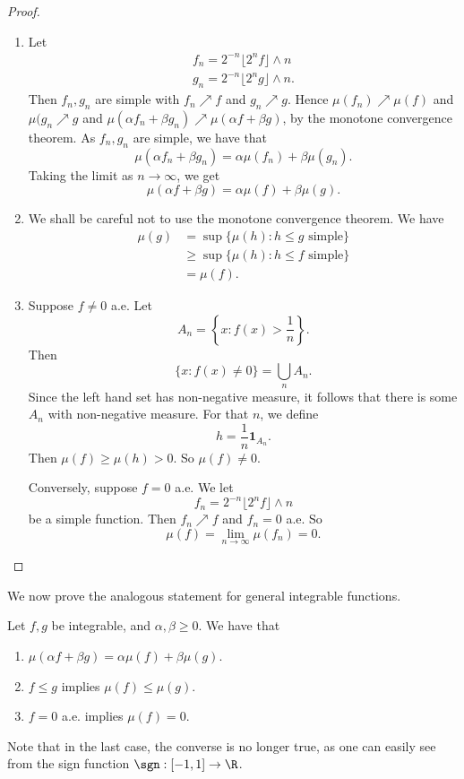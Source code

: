 \documentclass[a4paper]{article}
\begin{document}
\begin{proof}\leavevmode
  \begin{enumerate}
    \item Let
      \begin{align*}
        f_n = 2^{-n}\lfloor 2^n f\rfloor \wedge n\\
        g_n = 2^{-n}\lfloor 2^n g\rfloor \wedge n.
      \end{align*}
      Then $f_n, g_n$ are simple with $f_n \nearrow f$ and $g_n \nearrow g$. Hence $\mu(f_n) \nearrow \mu(f)$ and $\mu(g_n \nearrow g$ and $\mu(\alpha f_n + \beta g_n) \nearrow \mu(\alpha f + \beta g)$, by the monotone convergence theorem. As $f_n, g_n$ are simple, we have that
      \[
        \mu(\alpha f_n + \beta g_n) = \alpha \mu(f_n) + \beta \mu(g_n).
      \]
      Taking the limit as $n \to \infty$, we get
      \[
        \mu(\alpha f + \beta g) = \alpha \mu(f) + \beta \mu(g).
      \]
    \item We shall be careful not to use the monotone convergence theorem. We have
      \begin{align*}
        \mu(g) &= \sup\{\mu(h): h \leq g\text{ simple}\}\\
        &\geq \sup \{\mu(h): h \leq f\text{ simple}\}\\
        &= \mu(f).
      \end{align*}
    \item Suppose $f \not= 0$ a.e. Let
      \[
        A_n = \left\{x: f(x) > \frac{1}{n}\right\}.
      \]
      Then
      \[
        \{x: f(x) \not= 0\} = \bigcup_n A_n.
      \]
      Since the left hand set has non-negative measure, it follows that there is some $A_n$ with non-negative measure. For that $n$, we define
      \[
        h = \frac{1}{n} \mathbf{1}_{A_n}.
      \]
      Then $\mu(f) \geq \mu(h) > 0$. So $\mu(f) \not= 0$.

      Conversely, suppose $f = 0$ a.e. We let
      \[
        f_n = 2^{-n} \lfloor 2^n f\rfloor \wedge n
      \]
      be a simple function. Then $f_n \nearrow f$ and $f_n = 0$ a.e. So
      \[
        \mu(f) = \lim_{n \to \infty}\mu(f_n) = 0.
      \]
  \end{enumerate}
\end{proof}

We now prove the analogous statement for general integrable functions.
\begin{thm}
  Let $f, g$ be integrable, and $\alpha, \beta \geq 0$. We have that
  \begin{enumerate}
    \item $\mu(\alpha f + \beta g) = \alpha \mu(f) + \beta \mu(g)$.
    \item $f \leq g$ implies $\mu(f) \leq \mu(g)$.
    \item $f = 0$ a.e. implies $\mu(f) = 0$.
  \end{enumerate}
\end{thm}
Note that in the last case, the converse is no longer true, as one can easily see from the sign function $\sgn: [-1, 1] \to \R$.
\end{document}
